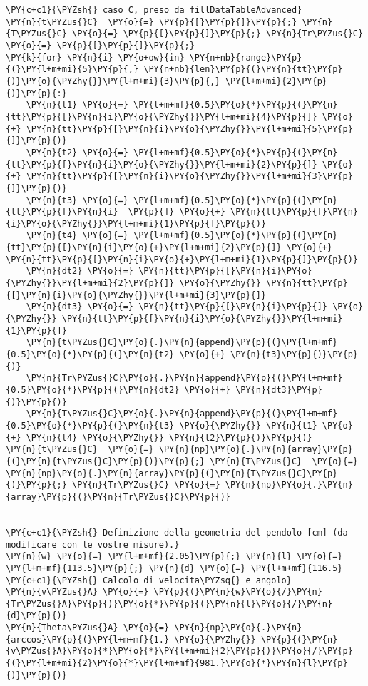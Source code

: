 \begin{Verbatim}[label=\makebox{\href{https://github.com/unipi-physics-labs/lab1-sheets/tree/main/snippy/plasduino_pendulum_testT.py}{https://github.com/.../plasduino\_pendulum\_testT.py}},commandchars=\\\{\}]
\PY{c+c1}{\PYZsh{} caso C, preso da fillDataTableAdvanced}
\PY{n}{t\PYZus{}C}  \PY{o}{=} \PY{p}{[}\PY{p}{]}\PY{p}{;} \PY{n}{T\PYZus{}C} \PY{o}{=} \PY{p}{[}\PY{p}{]}\PY{p}{;} \PY{n}{Tr\PYZus{}C} \PY{o}{=} \PY{p}{[}\PY{p}{]}\PY{p}{;}
\PY{k}{for} \PY{n}{i} \PY{o+ow}{in} \PY{n+nb}{range}\PY{p}{(}\PY{l+m+mi}{5}\PY{p}{,} \PY{n+nb}{len}\PY{p}{(}\PY{n}{tt}\PY{p}{)}\PY{o}{\PYZhy{}}\PY{l+m+mi}{3}\PY{p}{,} \PY{l+m+mi}{2}\PY{p}{)}\PY{p}{:}
    \PY{n}{t1} \PY{o}{=} \PY{l+m+mf}{0.5}\PY{o}{*}\PY{p}{(}\PY{n}{tt}\PY{p}{[}\PY{n}{i}\PY{o}{\PYZhy{}}\PY{l+m+mi}{4}\PY{p}{]} \PY{o}{+} \PY{n}{tt}\PY{p}{[}\PY{n}{i}\PY{o}{\PYZhy{}}\PY{l+m+mi}{5}\PY{p}{]}\PY{p}{)}
    \PY{n}{t2} \PY{o}{=} \PY{l+m+mf}{0.5}\PY{o}{*}\PY{p}{(}\PY{n}{tt}\PY{p}{[}\PY{n}{i}\PY{o}{\PYZhy{}}\PY{l+m+mi}{2}\PY{p}{]} \PY{o}{+} \PY{n}{tt}\PY{p}{[}\PY{n}{i}\PY{o}{\PYZhy{}}\PY{l+m+mi}{3}\PY{p}{]}\PY{p}{)}
    \PY{n}{t3} \PY{o}{=} \PY{l+m+mf}{0.5}\PY{o}{*}\PY{p}{(}\PY{n}{tt}\PY{p}{[}\PY{n}{i}  \PY{p}{]} \PY{o}{+} \PY{n}{tt}\PY{p}{[}\PY{n}{i}\PY{o}{\PYZhy{}}\PY{l+m+mi}{1}\PY{p}{]}\PY{p}{)}
    \PY{n}{t4} \PY{o}{=} \PY{l+m+mf}{0.5}\PY{o}{*}\PY{p}{(}\PY{n}{tt}\PY{p}{[}\PY{n}{i}\PY{o}{+}\PY{l+m+mi}{2}\PY{p}{]} \PY{o}{+} \PY{n}{tt}\PY{p}{[}\PY{n}{i}\PY{o}{+}\PY{l+m+mi}{1}\PY{p}{]}\PY{p}{)}
    \PY{n}{dt2} \PY{o}{=} \PY{n}{tt}\PY{p}{[}\PY{n}{i}\PY{o}{\PYZhy{}}\PY{l+m+mi}{2}\PY{p}{]} \PY{o}{\PYZhy{}} \PY{n}{tt}\PY{p}{[}\PY{n}{i}\PY{o}{\PYZhy{}}\PY{l+m+mi}{3}\PY{p}{]}
    \PY{n}{dt3} \PY{o}{=} \PY{n}{tt}\PY{p}{[}\PY{n}{i}\PY{p}{]} \PY{o}{\PYZhy{}} \PY{n}{tt}\PY{p}{[}\PY{n}{i}\PY{o}{\PYZhy{}}\PY{l+m+mi}{1}\PY{p}{]}
    \PY{n}{t\PYZus{}C}\PY{o}{.}\PY{n}{append}\PY{p}{(}\PY{l+m+mf}{0.5}\PY{o}{*}\PY{p}{(}\PY{n}{t2} \PY{o}{+} \PY{n}{t3}\PY{p}{)}\PY{p}{)}
    \PY{n}{Tr\PYZus{}C}\PY{o}{.}\PY{n}{append}\PY{p}{(}\PY{l+m+mf}{0.5}\PY{o}{*}\PY{p}{(}\PY{n}{dt2} \PY{o}{+} \PY{n}{dt3}\PY{p}{)}\PY{p}{)}
    \PY{n}{T\PYZus{}C}\PY{o}{.}\PY{n}{append}\PY{p}{(}\PY{l+m+mf}{0.5}\PY{o}{*}\PY{p}{(}\PY{n}{t3} \PY{o}{\PYZhy{}} \PY{n}{t1} \PY{o}{+} \PY{n}{t4} \PY{o}{\PYZhy{}} \PY{n}{t2}\PY{p}{)}\PY{p}{)}
\PY{n}{t\PYZus{}C}  \PY{o}{=} \PY{n}{np}\PY{o}{.}\PY{n}{array}\PY{p}{(}\PY{n}{t\PYZus{}C}\PY{p}{)}\PY{p}{;} \PY{n}{T\PYZus{}C}  \PY{o}{=} \PY{n}{np}\PY{o}{.}\PY{n}{array}\PY{p}{(}\PY{n}{T\PYZus{}C}\PY{p}{)}\PY{p}{;} \PY{n}{Tr\PYZus{}C} \PY{o}{=} \PY{n}{np}\PY{o}{.}\PY{n}{array}\PY{p}{(}\PY{n}{Tr\PYZus{}C}\PY{p}{)}


\PY{c+c1}{\PYZsh{} Definizione della geometria del pendolo [cm] (da modificare con le vostre misure).}
\PY{n}{w} \PY{o}{=} \PY{l+m+mf}{2.05}\PY{p}{;} \PY{n}{l} \PY{o}{=} \PY{l+m+mf}{113.5}\PY{p}{;} \PY{n}{d} \PY{o}{=} \PY{l+m+mf}{116.5}
\PY{c+c1}{\PYZsh{} Calcolo di velocita\PYZsq{} e angolo}
\PY{n}{v\PYZus{}A} \PY{o}{=} \PY{p}{(}\PY{n}{w}\PY{o}{/}\PY{n}{Tr\PYZus{}A}\PY{p}{)}\PY{o}{*}\PY{p}{(}\PY{n}{l}\PY{o}{/}\PY{n}{d}\PY{p}{)}
\PY{n}{Theta\PYZus{}A} \PY{o}{=} \PY{n}{np}\PY{o}{.}\PY{n}{arccos}\PY{p}{(}\PY{l+m+mf}{1.} \PY{o}{\PYZhy{}} \PY{p}{(}\PY{n}{v\PYZus{}A}\PY{o}{*}\PY{o}{*}\PY{l+m+mi}{2}\PY{p}{)}\PY{o}{/}\PY{p}{(}\PY{l+m+mi}{2}\PY{o}{*}\PY{l+m+mf}{981.}\PY{o}{*}\PY{n}{l}\PY{p}{)}\PY{p}{)}


\end{Verbatim}
